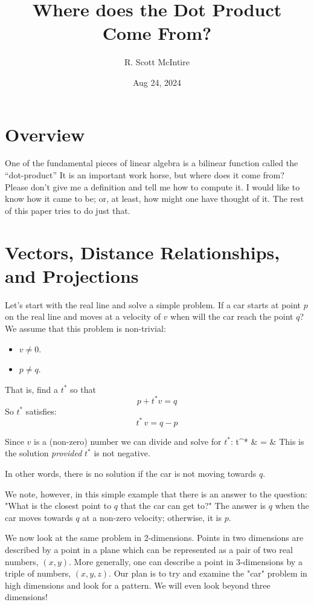 \documentclass[12pt]{article}
\title{Where does the Dot Product Come From?}
\author{R. Scott McIntire}
\date{Aug 24, 2024}
\begin{document}
\maketitle

\section{Overview}
One of the fundamental pieces of linear algebra is a bilinear function
called the ``dot-product'' It is an important work horse, but where does
it come from? Please don't give me a definition and tell me how to compute it.
I would like to know how it came to be; or, at least, how might one
have thought of it. The rest of this paper tries to do just that.

\section{ Vectors, Distance Relationships, and Projections}
Let's start with the real line and solve a simple problem. 
If a car starts at 
point $p$ on the real line and moves at a velocity of $v$ when will the car 
reach the point $q$? We assume that this problem is non-trivial:
\begin{itemize}
	\item{$v \ne 0$.}
	\item{$p \ne q$.}
\end{itemize}

That is, find a $t^*$ so that
$$ p + t^* v = q$$
So $t^*$ satisfies:
$$ t^* \, v = q - p$$

Since $v$ is a (non-zero) number we can divide and solve for 
$t^*$:%
\be
	t^* & = &  \label{closest_1}
\ee
This is the solution {\em provided\/} 
$t^*$ is not negative.

In other words, there is no solution if the car is not 
moving towards $q$.

We note, however, in this simple example that there is an answer to the question:
"What is the closest point to $q$ that the car can get to?"
The answer is $q$ when the car moves towards $q$ at a non-zero velocity; otherwise,
it is $p$.

We now look at the same problem in 2-dimensions. Points in two dimensions 
are described by a point in a plane which can be represented as a pair of 
two real numbers, $(x, y)$. More generally, one can describe a point in 3-dimensions
by a triple of numbers, $(x, y, z)$. Our plan is to try and examine the "car"
problem in high dimensions and look for a pattern. We will even look beyond
three dimensions!
\end{document}
